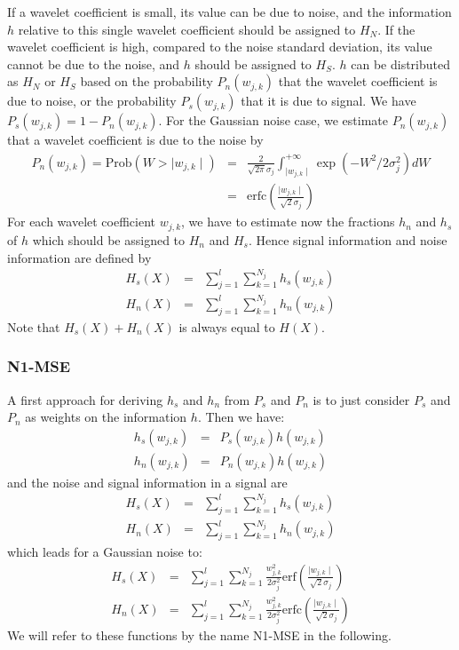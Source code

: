 If a wavelet coefficient is small, its value can be due to noise, 
and the information $h$ relative to this single wavelet coefficient
should be assigned to $H_N$.
If the wavelet coefficient is high, compared to the noise standard
deviation, its value cannot be due to the noise, and $h$ should be assigned to $H_S$.
$h$ can be distributed as $H_N$ or $H_S$ based on  the probability $P_n(w_{j,k})$
that the wavelet coefficient is due to noise, or the probability 
$P_s(w_{j,k})$ that it is due to 
signal.  We have $P_s(w_{j,k}) = 1 - P_n(w_{j,k})$. 
For the Gaussian noise case, we estimate $P_n(w_{j,k})$ that a wavelet 
coefficient is due to the noise by
\begin{eqnarray*}
P_n(w_{j,k}) = \mathrm{Prob}(W > \mid w_{j,k} \mid)  & =  & \frac{2}{\sqrt{2 \pi} 
\sigma_j} \int_{\mid w_{j,k} \mid}^{+\infty} \exp(-W^2/2\sigma^2_j) dW \nonumber \\ 
 & = & \mbox{erfc}(\frac{\mid w_{j,k} \mid }{\sqrt{2}\sigma_j})
\end{eqnarray*}
For each wavelet coefficient $w_{j,k}$, we have to estimate now the fractions
$h_n$ and $h_s$ of $h$ which should be assigned to $H_n$ and $H_s$.
Hence  signal information and  noise information are defined by
\begin{eqnarray}
H_s(X) & = & \sum_{j=1}^{l} \sum_{k=1}^{N_j} h_s(w_{j,k})   \nonumber  \\  
H_n(X) & = & \sum_{j=1}^{l} \sum_{k=1}^{N_j} h_n(w_{j,k})     
\label{eq_entrop_result_2}
\end{eqnarray}
Note that $H_s(X) + H_n(X)$ is always equal to $H(X)$. 


\subsubsection{N1-MSE}
A first approach for deriving $h_s$ and $h_n$ from $P_s$ and $P_n$ is to
just consider $P_s$ and $P_n$ as weights on the information $h$. Then we
have:
\begin{eqnarray}
h_s( w_{j,k}) & = & P_s(w_{j,k})  h(w_{j,k})    \nonumber \\  
h_n( w_{j,k}) & = & P_n(w_{j,k})  h(w_{j,k})     
\label{eq_mse1}
\end{eqnarray}
and the noise and signal information in a signal are
\begin{eqnarray}
H_s(X) & = & \sum_{j=1}^{l} \sum_{k=1}^{N_j} h_s(w_{j,k})    \nonumber \\  
H_n(X) & = & \sum_{j=1}^{l} \sum_{k=1}^{N_j} h_n(w_{j,k})     
\label{eq_entrop_result_1}
\end{eqnarray}
which leads for a Gaussian noise to:
\begin{eqnarray}
H_s(X) &= & \sum_{j=1}^{l}  \sum_{k=1}^{N_j}  \frac{w_{j,k}^2}{2\sigma_j^2} 
\mbox{erf}(\frac{\mid w_{j,k} \mid }{\sqrt{2}\sigma_j}) \nonumber \\ 
H_n(X) &= & \sum_{j=1}^{l}  \sum_{k=1}^{N_j}  \frac{w_{j,k}^2}{2\sigma_j^2} 
\mbox{erfc}(\frac{\mid w_{j,k} \mid }{\sqrt{2}\sigma_j}) 
\label{eq_entrop_gauss_result_1} 
\end{eqnarray}
We will refer to these functions by the name N1-MSE in the following.

